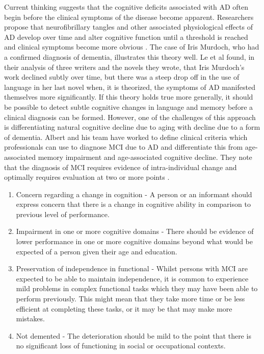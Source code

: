 \documentclass[10pt, letterpaper, twoside, openany]{book}
\begin{document}
\par
Current thinking suggests that the cognitive deficits associated with AD often begin before the clinical symptoms of the disease become apparent. Researchers propose that neurofibrillary tangles and other associated physiological effects of AD develop over time and alter cognitive function until a threshold is reached and clinical symptoms become more obvious \cite{Nestor2006}. The case of Iris Murdoch, who had a confirmed diagnosis of dementia, illustrates this theory well. Le et al \cite{Le2011}found, in their analysis of three writers and the novels they wrote, that Iris Murdoch's work declined subtly over time, but there was a steep drop off in the use of language in her last novel when, it is theorized, the symptoms of AD manifested themselves more significantly. If this theory holds true more generally, it should be possible to detect subtle cognitive changes in language and memory before a clinical diagnosis can be formed. However, one of the challenges of this approach is differentiating natural cognitive decline due to aging with decline due to a form of dementia. Albert and his team have worked to define clinical criteria which professionals can use to diagnose MCI due to AD and differentiate this from age-associated memory impairment and age-associated cognitive decline. They note that the diagnosis of MCI requires evidence of intra-individual change and optimally requires evaluation at two or more points \cite{Albert2011}.
\begin{enumerate}
	\item Concern regarding a change in cognition - A person or an informant should express concern that there is a change in cognitive ability in comparison to previous level of performance.
	\item Impairment in one or more cognitive domains - There should be evidence of lower performance in one or more cognitive domains beyond what would be expected of a person given their age and education. 
	\item Preservation of independence in functional - Whilst persons with MCI are expected to be able to maintain independence, it is common to experience mild problems in complex functional tasks which they may have been able to perform previously. This might mean that they take more time or be less efficient at completing these tasks, or it may be that may make more mistakes.
	\item Not demented - The deterioration should be mild to the point that there is no significant loss of functioning in social or occupational contexts.
\end{enumerate}
\end{document}
